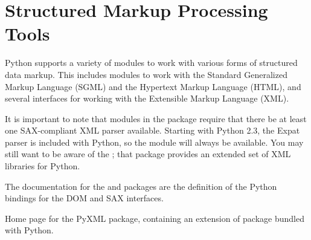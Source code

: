 \chapter{Structured Markup Processing Tools
         \label{markup}}

Python supports a variety of modules to work with various forms of
structured data markup.  This includes modules to work with the
Standard Generalized Markup Language (SGML) and the Hypertext Markup
Language (HTML), and several interfaces for working with the
Extensible Markup Language (XML).

It is important to note that modules in the  package
require that there be at least one SAX-compliant XML parser available.
Starting with Python 2.3, the Expat parser is included with Python, so
the  module will always be available.
You may still want to be aware of the ; that package provides an
extended set of XML libraries for Python.

The documentation for the  and 
packages are the definition of the Python bindings for the DOM and SAX
interfaces.

\localmoduletable

\begin{seealso}
           {Home page for the PyXML package, containing an extension
            of  package bundled with Python.}
\end{seealso}
